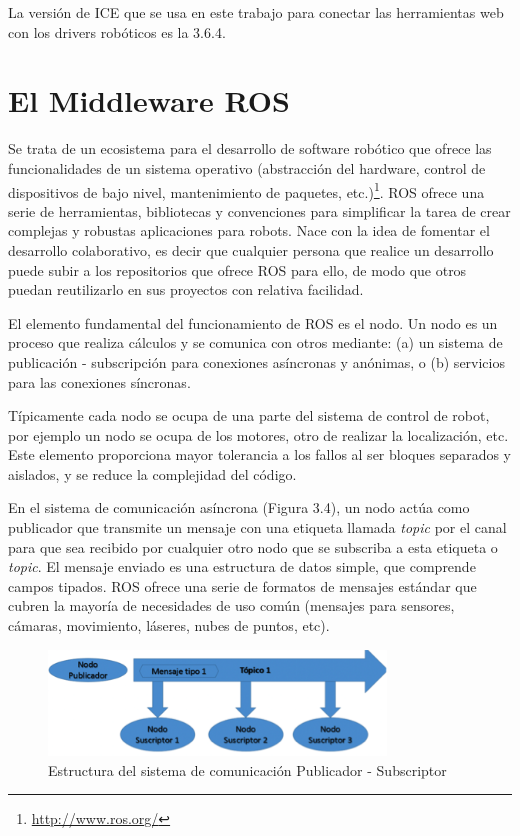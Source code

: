 La versión de ICE que se usa en este trabajo para conectar las herramientas web con los drivers robóticos es la 3.6.4.

\section{El Middleware ROS}
Se trata de un ecosistema para el desarrollo de software robótico que ofrece las funcionalidades de un sistema operativo (abstracción del hardware, control de dispositivos de bajo nivel, mantenimiento de paquetes, etc.)\footnote{\url{http://www.ros.org/}}. ROS ofrece una serie de herramientas, bibliotecas y convenciones para simplificar la tarea de crear complejas y robustas aplicaciones para robots. Nace con la idea de fomentar el desarrollo colaborativo, es decir que cualquier persona que realice un desarrollo puede subir a los repositorios que ofrece ROS para ello, de modo que otros puedan reutilizarlo en sus proyectos con relativa facilidad.

El elemento fundamental del funcionamiento de ROS es el nodo. Un nodo es un proceso que realiza cálculos y se comunica con otros mediante: (a) un sistema de publicación - subscripción para conexiones asíncronas y anónimas, o (b) servicios para las conexiones síncronas. 

Típicamente cada nodo se ocupa de una parte del sistema de control de robot, por ejemplo un nodo se ocupa de los motores, otro de realizar la localización, etc. Este elemento proporciona mayor tolerancia a los fallos al ser bloques separados y aislados, y se reduce la complejidad del código.

En el sistema de comunicación asíncrona (Figura 3.4), un nodo actúa como publicador que transmite un mensaje con una etiqueta llamada \textit{topic} por el canal para que sea recibido por cualquier otro nodo que se subscriba a esta etiqueta o \textit{topic}. El mensaje enviado es una estructura de datos simple, que comprende campos tipados. ROS ofrece una serie de formatos de mensajes estándar que cubren la mayoría de necesidades de uso común (mensajes para sensores, cámaras, movimiento, láseres, nubes de puntos, etc).

\begin{figure}[H]
  \begin{center}
    \includegraphics[width=0.8\textwidth]{figures/publicadorsubscriptor.png}
		\caption{Estructura del sistema de comunicación Publicador - Subscriptor}
		\label{fig.publicadorsubscriptor}
		\end{center}
\end{figure}

